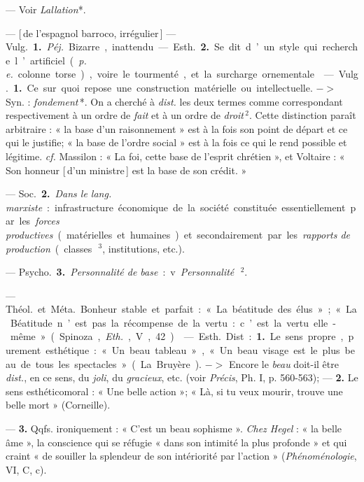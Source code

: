 
	\begin{itemize}[leftmargin=1cm, label=, itemsep=1pt]

 — Voir {\it Lallation}*.

 — [\,de l'espagnol {\it }barroco, irrégulier\,] — \si{Vulg.} {\bf 1.} {\it Péj.} Bizarre,
inattendu. — \si{Esth.} {\bf 2.} Se dit d’un
style qui recherche l’artificiel ({\it p. e.}
colonne torse), voire le tourmenté,
et la surcharge ornementale.

 — \si{Vulg.} {\bf 1.} Ce sur quoi repose
une construction matérielle ou intellectuelle. $->$ Syn. : {\it fondement}\,*. On
a cherché à {\it dist.} les deux termes
comme correspondant respectivement à un ordre de {\it fait} et à un ordre
de {\it droit}\,$^2$. Cette distinction paraît
arbitraire : « la base d’un raisonnement » est à la fois son point de
départ et ce qui le justifie; « la base
de l’ordre social » est à la fois ce qui
le rend possible et légitime. {\it cf.}  Massilon : « La foi, cette base de l'esprit
chrétien », et Voltaire : « Son honneur [\,d'un ministre\,] est la base de
son crédit. »

— \si{Soc.} {\bf 2.} {\it Dans le lang. marxiste} :
infrastructure économique de la
société constituée essentiellement
par les {\it forces productives} (matérielles
et humaines) et secondairement par
les {\it rapports de production} (classes\,$^3$,
institutions, etc.).

— \si{Psycho.} {\bf 3.} {\it Personnalité de base} :
v. {\it Personnalité}\,$^2$.

 — \si{Théol.} et \si{Méta.} Bonheur
stable et parfait : « La béatitude des
élus »; « La Béatitude n’est pas la
récompense de la vertu : c’est la vertu elle-même » (Spinoza, {\it Eth.}, V, 42).

 — \si{Esth.} Dist. : {\bf 1.} Le sens propre,
purement esthétique : « Un beau
tableau », « Un beau visage est le
plus beau de tous les spectacles » (La
Bruyère). $->$ Encore le {\it beau} doit-il
être {\it dist.}, en ce sens, du {\it joli}, du
{\it gracieux}, etc. (voir {\it Précis}, Ph. I,
p. 560-563); — {\bf 2.} Le sens esthéticomoral : « Une belle action »; « Là, si
tu veux mourir, trouve une belle
mort » (Corneille).
 
— {\bf 3.} Qqfs. ironiquement : « C’est
un beau sophisme ». {\it Chez Hegel} :
« la belle âme », la conscience qui se
réfugie « dans son intimité la plus
profonde » et qui craint « de souiller
la splendeur de son intériorité par
l’action » ({\it Phénoménologie}, VI, C, c).


\end{itemize}
